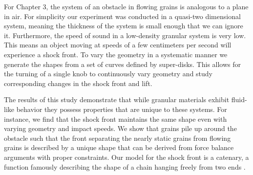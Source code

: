 For Chapter 3, the system of an obstacle in flowing grains is analogous to a plane in air. For simplicity our experiment was conducted in a quasi-two dimensional system, meaning the thickness of the system is small enough that we can ignore it. Furthermore, the speed of sound in a low-density granular system is very low. This means an object moving at speeds of a few centimeters per second will experience a shock front. To vary the geometry in a systematic manner we generate the shapes from a set of curves defined by super-disks. This allows for the turning of a single knob to continuously vary geometry and study corresponding changes in the shock front and lift. 

The results of this study demonstrate that while granular materials exhibit fluid-like behavior they possess properties that are unique to these systems. For instance, we find that the shock front maintains the same shape even with varying geometry and impact speeds. We show that grains pile up around the obstacle such that the front separating the nearly static grains from flowing grains is described by a unique shape that can be derived from force balance arguments with proper constraints. Our model for the shock front is a catenary, a function famously describing the shape of a chain hanging freely from two ends \cite{goldstein_classical_2002, mareno}.